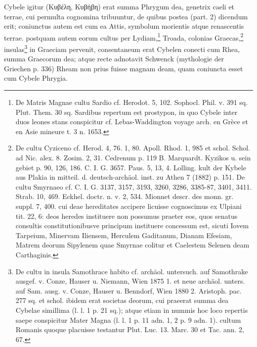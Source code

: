 \documentclass[a4paper, 11pt, oneside, polutonikogreek, german]{article}
\begin{document}
Cybele igitur (Κυβέλη, Κυβήβη) erat summa Phrygum dea, genetrix caeli et terrae, cui permulta cognomina tribuuntur, de quibus postea (part. 2) dicendum erit; coniunctus autem est cum ea Attis, symbolum morientis atque renascentis terrae. postquam autem eorum cultus per Lydiam,\footnote{De Matris Magnae cultu Sardio cf. Herodot. 5, 102. Sophocl. Phil. v. 391 sq. Plut. Them. 30 sq. Sardibus repertum est prostypon, in quo Cybele inter duos leones stans conspicitur cf. Lebas-Waddington voyage arch. en Grèce et en Asie mineure t. 3 n. 1653.} Troada, colonias Graecas,\footnote{De cultu Cyziceno cf. Herod. 4, 76. 1, 80. Apoll. Rhod. 1, 985 et schol. Schol. ad Nic. alex. 8. Zosim. 2, 31. Cedrenum p. 119 B. Marquardt. Kyzikos u. sein gebiet p. 90, 126, 186. C. I. G. 3657. Paus. 5, 13, 4. Lolling. kult der Kybele aus Plakia in mitteil. d. deutsch-archäol. inst. zu Athen 7 (1882) p. 151. De cultu Smyrnaeo cf. C. I. G. 3137, 3157, 3193, 3260, 3286, 3385-87, 3401, 3411. Strab. 10, 469. Eckhel. doctr. n. v. 2, 534. Mionnet descr. des monn. gr. suppl. 7, 400. cui deae hereditates accipere licuisse cognoscimus ex Ulpiani tit. 22, 6: deos heredes instituere non possumus praeter eos, quos senatus consultis constitutionibusve principum instituere concessum est, sicuti Iovem Tarpeium, Minervam Iliensem, Herculem Gaditanum, Dianam Efesiam, Matrem deorum Sipylenem quae Smyrnae colitur et Caelestem Selenen deam Carthaginis.} insulas\footnote{De cultu in insula Samothrace habito cf. archäol. untersuch. auf Samothrake ausgef. v. Conze, Hauser u. Niemann, Wien 1875 1. et neue archäol. unters. auf Sam. ausg. v. Conze, Hauser u. Benndorf, Wien 1880 2. Aristoph. pac. 277 sq. et schol. ibidem erat societas deorum, cui praeerat summa dea Cybelae simillima (l. l. 1 p. 21 sq.); atque etiam in nummis hoc loco repertis saepe conspicitur Mater Magna (l. l. 1 p. 11 adn. 1, 2 p. 9 adn. 1). cultum Romanis quoque placuisse testantur Plut. Luc. 13. Marc. 30 et Tac. ann. 2, 67.} in Graeciam pervenit, consentaneum erat Cybelen conecti cum Rhea, summa Graecorum dea; atque recte adnotavit Schwenck (mythologie der Griechen p. 336) Rheam non prius fuisse magnam deam, quam coniuncta esset cum Cybele Phrygia.
\end{document}
